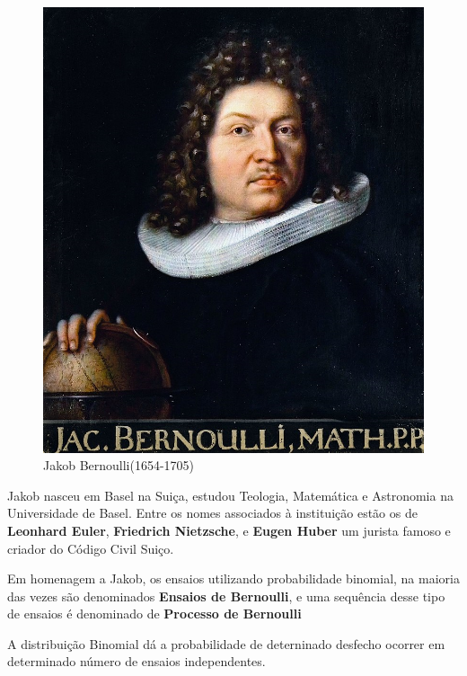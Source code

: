 \vspace{-1.68cm}
\begin{figure}
    \centering
\includegraphics[scale=0.2]{figures/Jakob_Bernoulli.jpeg}
    \caption{Jakob Bernoulli(1654-1705)}
    \label{fig:my_label4}
\end{figure}

Jakob nasceu em Basel na Suiça, estudou Teologia, Matemática e Astronomia na Universidade de Basel. Entre os nomes associados à instituição estão os de \textbf{Leonhard Euler}, \textbf{Friedrich Nietzsche}, e \textbf{Eugen Huber} um jurista famoso e criador do Código Civil Suiço. \vskip0.3cm



\newpage
Em homenagem a Jakob, os ensaios utilizando probabilidade binomial, na maioria das vezes são denominados \textbf{Ensaios de Bernoulli}, e uma sequência desse tipo de ensaios é denominado de \textbf{Processo de Bernoulli} 



A distribuição Binomial dá a probabilidade de deterninado desfecho ocorrer em determinado número de ensaios independentes. \vskip0.3cm


